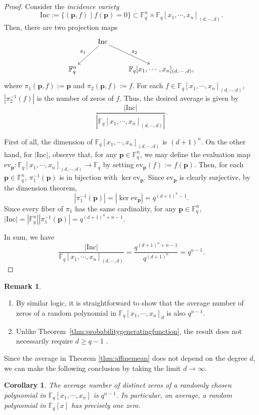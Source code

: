 \documentclass[12pt]{amsart}
\newtheorem{corollary}[theorem]{Corollary}
\theoremstyle{definition}
\newtheorem{remark}[theorem]{Remark}
\newcommand{\FF}{\mathbb{F} }
\newcommand{\bp}{\mathbf{p} }
\begin{document}
\begin{proof}
Consider the \emph{incidence variety}
\[
    \mathrm{Inc} := \{(\bp, f)\;|\; f(\bp) = 0\} \subset \FF_q^n \times \FF_q[x_1, \cdots, x_n]_{(d, \cdots, d)}.
\]
Then, there are two projection maps 
\[
\xymatrix{
& \mathrm{Inc} \ar[ld]_{\pi_1} \ar[rd]^{\pi_2}\\
\FF_q^n && \FF_q[x_1, \cdots, x_n]_{(d, \cdots, d)},
}
\]
where $\pi_1(\bp, f) := \bp$ and $\pi_2(\bp, f) := f$. For each $f \in \FF_q[x_1, \cdots, x_n]_{(d, \cdots, d)}$, $|\pi_2^{-1}(f)|$ is the number of zeros of $f$. Thus, the desired average is given by 
\[
    \frac{|\mathrm{Inc}|}{|\FF_q[x_1, \cdots, x_n]_{(d, \cdots, d)}|}.
\]

First of all, the dimension of $\FF_q[x_1, \cdots, x_n]_{(d, \cdots, d)}$ is $(d+1)^n$. On the other hand, for $|\mathrm{Inc}|$, observe that, for any $\bp \in \FF_q^n$, we may define the evaluation map $\mathrm{ev}_\bp : \FF_q[x_1, \cdots, x_n]_{(d, \cdots, d)} \to \FF_q$ by setting $\mathrm{ev}_\bp (f) := f(\bp)$. Then, for each $\bp \in \FF_q^n$, $\pi_1^{-1}(\bp)$ is in bijection with $\ker \mathrm{ev}_\bp$. Since $\mathrm{ev}_\bp$ is clearly surjective, by the dimension theorem, 
\[
    |\pi_1^{-1}(\bp)| = |\ker \mathrm{ev}_\bp| = 
    q^{(d+1)^n - 1}.
\]
Since every fiber of $\pi_1$ has the same cardinality, for any $\bp \in \FF_q^n$, $|\mathrm{Inc}| = |\FF_q^n||\pi_1^{-1}(\bp)| = q^{(d+1)^n + n - 1}$.

In sum, we have 
\[
    \frac{|\mathrm{Inc}|}{\FF_q[x_1, \cdots, x_n]_{(d, \cdots, d)}} = 
    \frac{q^{(d+1)^n + n-1}}{q^{(d+1)^n}} = q^{n-1}.
\]
\end{proof}

\begin{remark}\label{rmk:totaldegreeaverage}
\begin{enumerate}
\item By similar logic, it is straightforward to show that the average number of zeros of a random polynomial in $\FF_q[x_1, \cdots, x_n]_d$ is also $q^{n-1}$. 
\item Unlike Theorem~\ref{thm:probabilitygeneratingfunction}, the result does not necessarily require $d \ge q-1$ .
\end{enumerate}
\end{remark}

Since the average in Theorem \ref{thm:affinemean} does not depend on the degree $d$, we can make the following conclusion by taking the limit $d \to \infty$. 

\begin{corollary}\label{cor:affinemean}
The average number of distinct zeros of a randomly chosen polynomial in $\FF_q[x_1, \cdots, x_n]$ is $q^{n-1}$. In particular, on average, a random polynomial in $\FF_q[x]$ has precisely one zero. 
\end{corollary}
\end{document}
